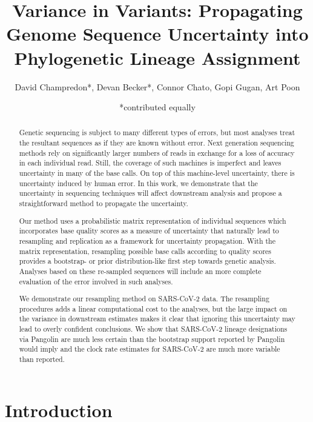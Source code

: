 \documentclass[10pt]{article}
\title{Variance in Variants: Propagating Genome Sequence Uncertainty
into Phylogenetic Lineage Assignment}
\author{David Champredon*, Devan Becker*, Connor Chato, Gopi Gugan, Art
Poon}
\date{*contributed equally}
\begin{document}
\maketitle

\normalsize
\vspace{1cm}
\tableofcontents

\begin{abstract}
Genetic sequencing is subject to many different types of errors, but most analyses treat the resultant sequences as if they are known without error. Next generation sequencing methods rely on significantly larger numbers  of reads in exchange for a loss of accuracy in each individual read. Still, the coverage of such machines is imperfect and leaves uncertainty in many of the base calls. On top of this machine-level uncertainty, there is uncertainty induced by human error. In this work, we demonstrate that the uncertainty in sequencing techniques will affect downstream analysis and propose a straightforward method to propagate the uncertainty.

Our method uses a probabilistic matrix representation of individual sequences which incorporates base quality scores as a measure of uncertainty that naturally lead to resampling and replication as a framework for uncertainty propagation. With the matrix representation, resampling possible base calls according to quality scores provides a bootstrap- or prior distribution-like first step towards genetic analysis. Analyses based on these re-sampled sequences will include an more complete evaluation of the error involved in such analyses.

We demonstrate our resampling method on SARS-CoV-2 data. The resampling procedures adds a linear computational cost to the analyses, but the large impact on the variance in downstream estimates makes it clear that ignoring this uncertainty may lead to overly confident conclusions. We show that SARS-CoV-2 lineage designations via Pangolin are much less certain than the bootstrap support reported by Pangolin would imply and the clock rate estimates for SARS-CoV-2 are much more variable than reported.
\end{abstract}


\section{Introduction}
\end{document}
